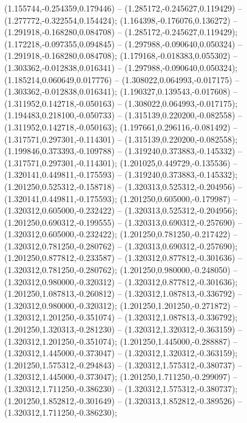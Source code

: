  (1.155744,-0.254359,0.179446) -- (1.285172,-0.245627,0.119429) -- (1.277772,-0.322554,0.154424);
 (1.164398,-0.176076,0.136272) -- (1.291918,-0.168280,0.084708) -- (1.285172,-0.245627,0.119429);
 (1.172218,-0.097355,0.094845) -- (1.297988,-0.090640,0.050324) -- (1.291918,-0.168280,0.084708);
 (1.179168,-0.018383,0.055302) -- (1.303362,-0.012838,0.016341) -- (1.297988,-0.090640,0.050324);
 (1.185214,0.060649,0.017776) -- (1.308022,0.064993,-0.017175) -- (1.303362,-0.012838,0.016341);
 (1.190327,0.139543,-0.017608) -- (1.311952,0.142718,-0.050163) -- (1.308022,0.064993,-0.017175);
 (1.194483,0.218100,-0.050733) -- (1.315139,0.220200,-0.082558) -- (1.311952,0.142718,-0.050163);
 (1.197661,0.296116,-0.081492) -- (1.317571,0.297301,-0.114301) -- (1.315139,0.220200,-0.082558);
 (1.199846,0.373393,-0.109788) -- (1.319240,0.373883,-0.145332) -- (1.317571,0.297301,-0.114301);
 (1.201025,0.449729,-0.135536) -- (1.320141,0.449811,-0.175593) -- (1.319240,0.373883,-0.145332);
 (1.201250,0.525312,-0.158718) -- (1.320313,0.525312,-0.204956) -- (1.320141,0.449811,-0.175593);
 (1.201250,0.605000,-0.179987) -- (1.320312,0.605000,-0.232422) -- (1.320313,0.525312,-0.204956);
 (1.201250,0.690312,-0.199555) -- (1.320313,0.690312,-0.257690) -- (1.320312,0.605000,-0.232422);
 (1.201250,0.781250,-0.217422) -- (1.320312,0.781250,-0.280762) -- (1.320313,0.690312,-0.257690);
 (1.201250,0.877812,-0.233587) -- (1.320312,0.877812,-0.301636) -- (1.320312,0.781250,-0.280762);
 (1.201250,0.980000,-0.248050) -- (1.320312,0.980000,-0.320312) -- (1.320312,0.877812,-0.301636);
 (1.201250,1.087813,-0.260812) -- (1.320312,1.087813,-0.336792) -- (1.320312,0.980000,-0.320312);
 (1.201250,1.201250,-0.271872) -- (1.320312,1.201250,-0.351074) -- (1.320312,1.087813,-0.336792);
 (1.201250,1.320313,-0.281230) -- (1.320312,1.320312,-0.363159) -- (1.320312,1.201250,-0.351074);
 (1.201250,1.445000,-0.288887) -- (1.320312,1.445000,-0.373047) -- (1.320312,1.320312,-0.363159);
 (1.201250,1.575312,-0.294843) -- (1.320312,1.575312,-0.380737) -- (1.320312,1.445000,-0.373047);
 (1.201250,1.711250,-0.299097) -- (1.320312,1.711250,-0.386230) -- (1.320312,1.575312,-0.380737);
 (1.201250,1.852812,-0.301649) -- (1.320313,1.852812,-0.389526) -- (1.320312,1.711250,-0.386230);
